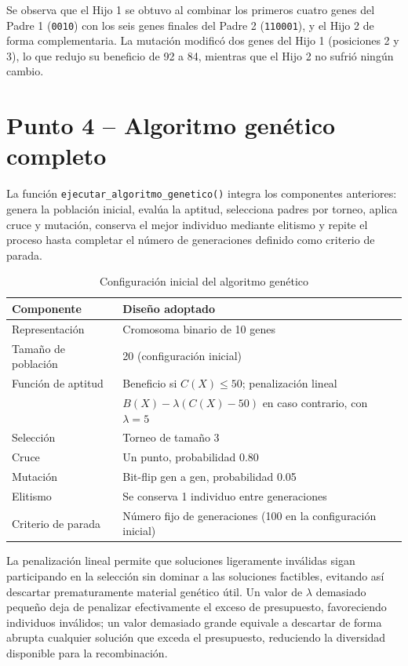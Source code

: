 \documentclass[12pt,a4paper]{article}
\begin{document}
Se observa que el Hijo 1 se obtuvo al combinar los primeros cuatro
genes del Padre 1 (\texttt{0010}) con los seis genes finales del
Padre 2 (\texttt{110001}), y el Hijo 2 de forma complementaria. La
mutaci\'{o}n modific\'{o} dos genes del Hijo 1 (posiciones 2 y 3), lo
que redujo su beneficio de 92 a 84, mientras que el Hijo 2 no sufri\'{o}
ning\'{u}n cambio.

\section{Punto 4 -- Algoritmo gen\'{e}tico completo}

La funci\'{o}n \texttt{ejecutar\_algoritmo\_genetico()} integra los
componentes anteriores: genera la poblaci\'{o}n inicial, eval\'{u}a la
aptitud, selecciona padres por torneo, aplica cruce y mutaci\'{o}n,
conserva el mejor individuo mediante elitismo y repite el proceso
hasta completar el n\'{u}mero de generaciones definido como criterio
de parada.

\begin{table}[H]
\centering
\caption{Configuraci\'{o}n inicial del algoritmo gen\'{e}tico}
\label{tab:diseno}
\begin{tabular}{ll}
\toprule
\textbf{Componente} & \textbf{Dise\~{n}o adoptado} \\
\midrule
Representaci\'{o}n & Cromosoma binario de 10 genes \\
Tama\~{n}o de poblaci\'{o}n & 20 (configuraci\'{o}n inicial) \\
Funci\'{o}n de aptitud & Beneficio si $C(X) \leq 50$; penalizaci\'{o}n lineal \\
 & $B(X) - \lambda(C(X)-50)$ en caso contrario, con $\lambda = 5$ \\
Selecci\'{o}n & Torneo de tama\~{n}o 3 \\
Cruce & Un punto, probabilidad 0.80 \\
Mutaci\'{o}n & Bit-flip gen a gen, probabilidad 0.05 \\
Elitismo & Se conserva 1 individuo entre generaciones \\
Criterio de parada & N\'{u}mero fijo de generaciones (100 en la configuraci\'{o}n inicial) \\
\bottomrule
\end{tabular}
\end{table}

La penalizaci\'{o}n lineal permite que soluciones ligeramente inv\'{a}lidas
sigan participando en la selecci\'{o}n sin dominar a las soluciones
factibles, evitando as\'{i} descartar prematuramente material gen\'{e}tico
\'{u}til. Un valor de $\lambda$ demasiado peque\~{n}o deja de penalizar
efectivamente el exceso de presupuesto, favoreciendo individuos
inv\'{a}lidos; un valor demasiado grande equivale a descartar de forma
abrupta cualquier soluci\'{o}n que exceda el presupuesto, reduciendo la
diversidad disponible para la recombinaci\'{o}n.
\end{document}
